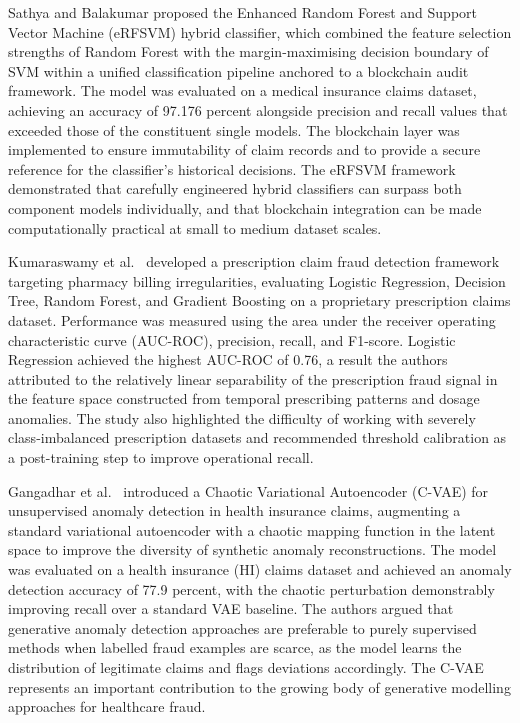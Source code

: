 Sathya and Balakumar \cite{sathya2022} proposed the Enhanced Random Forest and Support Vector Machine (eRFSVM) hybrid classifier, which combined the feature selection strengths of Random Forest with the margin-maximising decision boundary of SVM within a unified classification pipeline anchored to a blockchain audit framework. The model was evaluated on a medical insurance claims dataset, achieving an accuracy of 97.176 percent alongside precision and recall values that exceeded those of the constituent single models. The blockchain layer was implemented to ensure immutability of claim records and to provide a secure reference for the classifier's historical decisions. The eRFSVM framework demonstrated that carefully engineered hybrid classifiers can surpass both component models individually, and that blockchain integration can be made computationally practical at small to medium dataset scales.

Kumaraswamy et al.\ \cite{kumaraswamy2022} developed a prescription claim fraud detection framework targeting pharmacy billing irregularities, evaluating Logistic Regression, Decision Tree, Random Forest, and Gradient Boosting on a proprietary prescription claims dataset. Performance was measured using the area under the receiver operating characteristic curve (AUC-ROC), precision, recall, and F1-score. Logistic Regression achieved the highest AUC-ROC of 0.76, a result the authors attributed to the relatively linear separability of the prescription fraud signal in the feature space constructed from temporal prescribing patterns and dosage anomalies. The study also highlighted the difficulty of working with severely class-imbalanced prescription datasets and recommended threshold calibration as a post-training step to improve operational recall.

Gangadhar et al.\ \cite{gangadhar2022} introduced a Chaotic Variational Autoencoder (C-VAE) for unsupervised anomaly detection in health insurance claims, augmenting a standard variational autoencoder with a chaotic mapping function in the latent space to improve the diversity of synthetic anomaly reconstructions. The model was evaluated on a health insurance (HI) claims dataset and achieved an anomaly detection accuracy of 77.9 percent, with the chaotic perturbation demonstrably improving recall over a standard VAE baseline. The authors argued that generative anomaly detection approaches are preferable to purely supervised methods when labelled fraud examples are scarce, as the model learns the distribution of legitimate claims and flags deviations accordingly. The C-VAE represents an important contribution to the growing body of generative modelling approaches for healthcare fraud.

